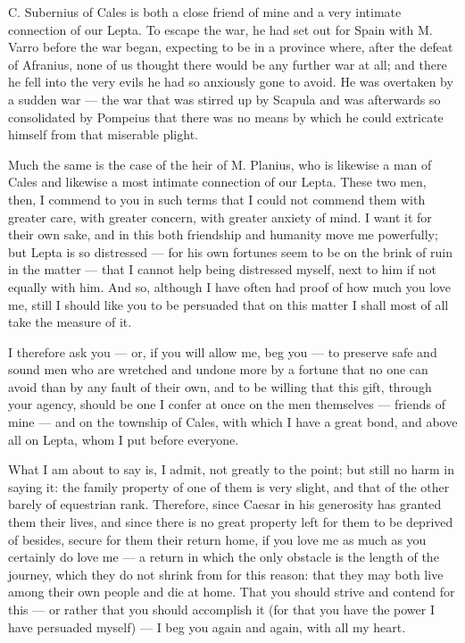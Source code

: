 

 C. Subernius of Cales is both a close friend of mine and a very intimate connection of our Lepta. To escape the war, he had set out for Spain with M. Varro before the war began, expecting to be in a province where, after the defeat of Afranius, none of us thought there would be any further war at all; and there he fell into the very evils he had so anxiously gone to avoid. He was overtaken by a sudden war --- the war that was stirred up by Scapula and was afterwards so consolidated by Pompeius that there was no means by which he could extricate himself from that miserable plight.

 Much the same is the case of the heir of M. Planius, who is likewise a man of Cales and likewise a most intimate connection of our Lepta. These two men, then, I commend to you in such terms that I could not commend them with greater care, with greater concern, with greater anxiety of mind. I want it for their own sake, and in this both friendship and humanity move me powerfully; but Lepta is so distressed --- for his own fortunes seem to be on the brink of ruin in the matter --- that I cannot help being distressed myself, next to him if not equally with him. And so, although I have often had proof of how much you love me, still I should like you to be persuaded that on this matter I shall most of all take the measure of it.

 I therefore ask you --- or, if you will allow me, beg you --- to preserve safe and sound men who are wretched and undone more by a fortune that no one can avoid than by any fault of their own, and to be willing that this gift, through your agency, should be one I confer at once on the men themselves --- friends of mine --- and on the township of Cales, with which I have a great bond, and above all on Lepta, whom I put before everyone.

 What I am about to say is, I admit, not greatly to the point; but still no harm in saying it: the family property of one of them is very slight, and that of the other barely of equestrian rank. Therefore, since Caesar in his generosity has granted them their lives, and since there is no great property left for them to be deprived of besides, secure for them their return home, if you love me as much as you certainly do love me --- a return in which the only obstacle is the length of the journey, which they do not shrink from for this reason: that they may both live among their own people and die at home. That you should strive and contend for this --- or rather that you should accomplish it (for that you have the power I have persuaded myself) --- I beg you again and again, with all my heart.
